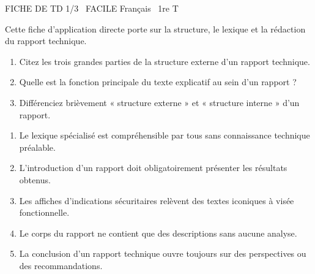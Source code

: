 \documentclass[11pt]{article}
\begin{document}
\begin{tcolorbox}[enhanced,colback=popink,colframe=popink,arc=10pt,boxrule=0pt,left=12pt,right=12pt,top=9pt,bottom=9pt]
{\color{white}\popxbold\small FICHE DE TD 1/3 \textbullet\ FACILE \hfill Français \textbullet\ 1re T\par}
\end{tcolorbox}
\vspace{4pt}
Cette fiche d'application directe porte sur la structure, le lexique et la rédaction du rapport technique.

\begin{exercice}
\begin{enumerate}
    \item Citez les trois grandes parties de la structure externe d'un rapport technique.
    \item Quelle est la fonction principale du texte explicatif au sein d'un rapport ?
    \item Différenciez brièvement « structure externe » et « structure interne » d'un rapport.
\end{enumerate}
\end{exercice}

\begin{exercice}
\begin{enumerate}
    \item Le lexique spécialisé est compréhensible par tous sans connaissance technique préalable.
    \item L'introduction d'un rapport doit obligatoirement présenter les résultats obtenus.
    \item Les affiches d'indications sécuritaires relèvent des textes iconiques à visée fonctionnelle.
    \item Le corps du rapport ne contient que des descriptions sans aucune analyse.
    \item La conclusion d'un rapport technique ouvre toujours sur des perspectives ou des recommandations.
\end{enumerate}
\end{exercice}
\end{document}
